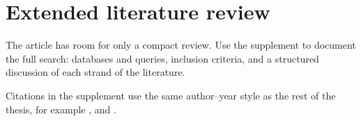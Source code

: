 \chapter{Extended literature review}

The article has room for only a compact review. Use the supplement to document the full search: databases and queries, inclusion criteria, and a structured discussion of each strand of the literature.

Citations in the supplement use the same author--year style as the rest of the thesis, for example \citet{bollerslev1986garch}, \citet{corsi2009har} and \citet{ansari2024chronos}.
